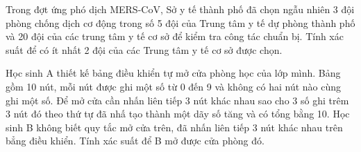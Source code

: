 \begin{vd}
	Trong đợt ứng phó dịch MERS-CoV, Sở y tế thành phố đã chọn ngẫu nhiên 3 đội phòng chống dịch cơ động trong số 5 đội của Trung tâm y tế dự phòng thành phố và 20 đội của các trung tâm y tế cơ sở để kiểm tra công tác chuẩn bị. Tính xác suất để có ít nhất 2 đội của các Trung tâm y tế cơ sở được chọn.
\end{vd} 

\begin{vd}
	Học sinh A thiết kế bảng điều khiển tự mở cửa phòng học của lớp mình. Bảng gồm 10 nút, mỗi nút được ghi một số từ 0 đến 9 và không có hai nút nào cùng ghi một số. Để mở cửa cần nhấn liên tiếp 3 nút khác nhau sao cho 3 số ghi trêm 3 nút đó theo thứ tự đã nhấ tạo thành một dãy số tăng và có tổng bằng 10. Học sinh B không biết quy tắc mở cửa trên, đã nhấn liên tiếp 3 nút khác nhau trên bẳng điều khiển. Tính xác suất để B mở được cửa phòng đó.
\end{vd} 

